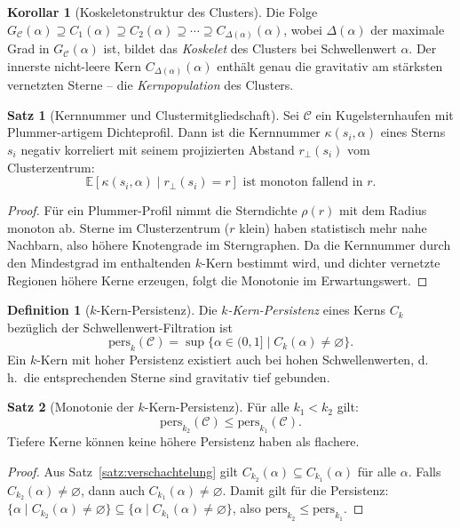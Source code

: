 ﻿\documentclass[a4paper,12pt]{report}
\theoremstyle{definition}
\newtheorem{definition}{Definition}
\newtheorem{satz}{Satz}
\newtheorem{korollar}{Korollar}
\begin{document}
\begin{korollar}[Koskeletonstruktur des Clusters]
\label{kor:koskelet}
Die Folge $G_\mathcal{C}(\alpha) \supseteq C_1(\alpha) \supseteq C_2(\alpha) \supseteq \cdots \supseteq C_{\Delta(\alpha)}(\alpha)$, wobei $\Delta(\alpha)$ der maximale Grad in $G_\mathcal{C}(\alpha)$ ist, bildet das \emph{Koskelet} des Clusters bei Schwellenwert $\alpha$. Der innerste nicht-leere Kern $C_{\Delta(\alpha)}(\alpha)$ enthält genau die gravitativ am stärksten vernetzten Sterne -- die \emph{Kernpopulation} des Clusters.
\end{korollar}

\begin{satz}[Kernnummer und Clustermitgliedschaft]
\label{satz:kernnummer}
Sei $\mathcal{C}$ ein Kugelsternhaufen mit Plummer-artigem Dichteprofil. Dann ist die Kernnummer $\kappa(s_i, \alpha)$ eines Sterns $s_i$ negativ korreliert mit seinem projizierten Abstand $r_\perp(s_i)$ vom Clusterzentrum:
\[
\mathbb{E}[\kappa(s_i, \alpha) \mid r_\perp(s_i) = r] \text{ ist monoton fallend in } r.
\]
\end{satz}

\begin{proof}
Für ein Plummer-Profil nimmt die Sterndichte $\rho(r)$ mit dem Radius monoton ab. Sterne im Clusterzentrum ($r$ klein) haben statistisch mehr nahe Nachbarn, also höhere Knotengrade im Sterngraphen. Da die Kernnummer durch den Mindestgrad im enthaltenden $k$-Kern bestimmt wird, und dichter vernetzte Regionen höhere Kerne erzeugen, folgt die Monotonie im Erwartungswert.
\end{proof}

\begin{definition}[$k$-Kern-Persistenz]
\label{def:kcore_persistenz}
Die \emph{$k$-Kern-Persistenz} eines Kerns $C_k$ bezüglich der Schwellenwert-Filtration ist
\[
\mathrm{pers}_k(\mathcal{C}) = \sup\{\alpha \in (0,1] \mid C_k(\alpha) \neq \varnothing\}.
\]
Ein $k$-Kern mit hoher Persistenz existiert auch bei hohen Schwellenwerten, d.\,h.\ die entsprechenden Sterne sind gravitativ tief gebunden.
\end{definition}

\begin{satz}[Monotonie der $k$-Kern-Persistenz]
\label{satz:kcore_mono}
Für alle $k_1 < k_2$ gilt:
\[
\mathrm{pers}_{k_2}(\mathcal{C}) \leq \mathrm{pers}_{k_1}(\mathcal{C}).
\]
Tiefere Kerne können keine höhere Persistenz haben als flachere.
\end{satz}

\begin{proof}
Aus Satz~\ref{satz:verschachtelung} gilt $C_{k_2}(\alpha) \subseteq C_{k_1}(\alpha)$ für alle $\alpha$. Falls $C_{k_2}(\alpha) \neq \varnothing$, dann auch $C_{k_1}(\alpha) \neq \varnothing$. Damit gilt für die Persistenz:
$\{\alpha \mid C_{k_2}(\alpha) \neq \varnothing\} \subseteq \{\alpha \mid C_{k_1}(\alpha) \neq \varnothing\}$,
also $\mathrm{pers}_{k_2} \leq \mathrm{pers}_{k_1}$.
\end{proof}
\end{document}
